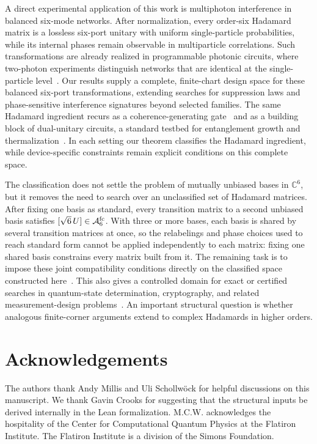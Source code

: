 A direct experimental application of this work is multiphoton interference in balanced six-mode networks. After normalization, every order-six Hadamard matrix is a lossless six-port unitary with uniform single-particle probabilities, while its internal phases remain observable in multiparticle correlations. Such transformations are already realized in programmable photonic circuits, where two-photon experiments distinguish networks that are identical at the single-particle level~\cite{Carolan2015Universal,Laing2012BerryPhase,Tichy2010ZeroTransmission,Crespi2015Sylvester,Crespi2016FFT,Shchesnovich2015Partial}. Our results supply a complete, finite-chart design space for these balanced six-port transformations, extending searches for suppression laws and phase-sensitive interference signatures beyond selected families. The same Hadamard ingredient recurs as a coherence-generating gate~\cite{Yao2016MaximalCoherence} and as a building block of dual-unitary circuits, a standard testbed for entanglement growth and thermalization~\cite{Gutkin2020DualUnitary,Claeys2022StateDesigns}. In each setting our theorem classifies the Hadamard ingredient, while device-specific constraints remain explicit conditions on this complete space.

The classification does not settle the problem of mutually unbiased bases in $\mathbb C^6$, but it removes the need to search over an unclassified set of Hadamard matrices. After fixing one basis as standard, every transition matrix to a second unbiased basis satisfies $[\sqrt6\,U]\in\mathcal A_6^{\mathrm{fc}}$.
With three or more bases, each basis is shared by several transition matrices at once, so the relabelings and phase choices used to reach standard form cannot be applied independently to each matrix: fixing one shared basis constrains every matrix built from it. The remaining task is to impose these joint compatibility conditions directly on the classified space constructed here~\cite{WoottersFields1989,BengtssonEtAl2007,HorodeckiRudnickiZyczkowski2022,McNultyWeigert2026,MatolcsiEtAl2026MUBTriplets}. 
This also gives a controlled domain for exact or certified searches in quantum-state determination, cryptography, and related measurement-design
problems~\cite{WoottersFields1989,Cerf2002,Englert2001,Aravind2003}. An important structural question is whether analogous finite-corner arguments extend to complex Hadamards in higher orders. 



\section*{Acknowledgements}
The authors thank Andy Millis and Uli Schollwöck for helpful discussions on this manuscript.
We thank Gavin Crooks for suggesting that the structural inputs be derived internally in the Lean formalization.
M.C.W. acknowledges the hospitality of the Center for Computational Quantum Physics at the Flatiron Institute. The Flatiron Institute is a division of the Simons Foundation.

